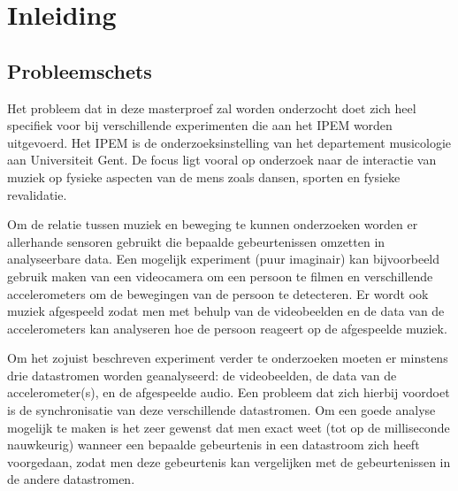 \chapter{Inleiding}

\section{Probleemschets}

Het probleem dat in deze masterproef zal worden onderzocht doet zich heel specifiek voor bij verschillende experimenten die aan het IPEM worden uitgevoerd. Het IPEM is de onderzoeksinstelling van het departement musicologie aan Universiteit Gent. De focus ligt vooral op onderzoek naar de interactie van muziek op fysieke aspecten van de mens zoals dansen, sporten en fysieke revalidatie.\cite{ipem2016}

Om de relatie tussen muziek en beweging te kunnen onderzoeken worden er allerhande sensoren gebruikt die bepaalde gebeurtenissen omzetten in analyseerbare data. Een mogelijk experiment (puur imaginair) kan bijvoorbeeld gebruik maken van een videocamera om een persoon te filmen en verschillende accelerometers om de bewegingen van de persoon te detecteren. Er wordt ook muziek afgespeeld zodat men met behulp van de videobeelden en de data van de accelerometers kan analyseren hoe de persoon reageert op de afgespeelde muziek.

Om het zojuist beschreven experiment verder te onderzoeken moeten er minstens drie datastromen worden geanalyseerd: de videobeelden, de data van de accelerometer(s), en de afgespeelde audio. Een probleem dat zich hierbij voordoet is de synchronisatie van deze verschillende datastromen. Om een goede analyse mogelijk te maken is het zeer gewenst dat men exact weet (tot op de milliseconde nauwkeurig) wanneer een bepaalde gebeurtenis in een datastroom zich heeft voorgedaan, zodat men deze gebeurtenis kan vergelijken met de gebeurtenissen in de andere datastromen.

